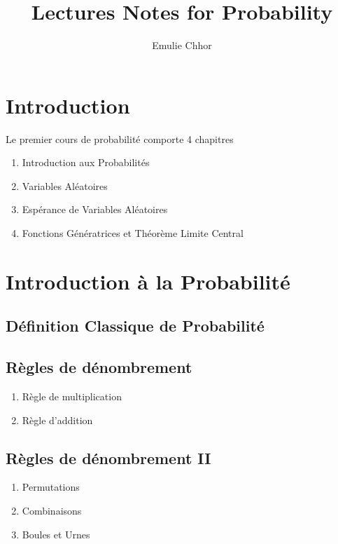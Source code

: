\documentclass{article}
\begin{document}
\title{Lectures Notes for Probability}
\author{Emulie Chhor}
\maketitle

\section*{Introduction}

Le premier cours de probabilité comporte 4 chapitres

\begin{enumerate}
    \item Introduction aux Probabilités
    \item Variables Aléatoires
    \item Espérance de Variables Aléatoires
    \item Fonctions Génératrices et Théorème Limite Central
\end{enumerate}

\section{Introduction à la Probabilité}

\subsection{Définition Classique de Probabilité}

\subsection{Règles de dénombrement}

\begin{enumerate}
    \item Règle de multiplication
    \item Règle d'addition
\end{enumerate}

\subsection{Règles de dénombrement II}

\begin{enumerate}
    \item Permutations
    \item Combinaisons
    \item Boules et Urnes
\end{enumerate}
\end{document}
